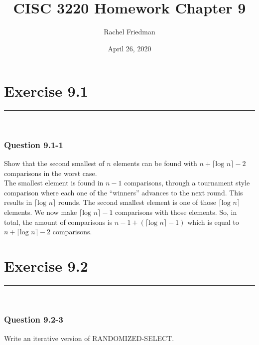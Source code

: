 \documentclass[11pt]{article}
\title{CISC 3220 Homework Chapter 9}
\author{Rachel Friedman}
\date{April 26, 2020}
\begin{document}
\maketitle

\section*{Exercise 9.1}\nointerlineskip
\noindent \rule{\linewidth}{0.01pt}\\
\subsubsection*{Question 9.1-1}\nointerlineskip

Show that the second smallest of $n$ elements can be found with $n+\lceil \text{log }n \rceil - 2 $ comparisons in the worst case.\\

The smallest element is found in $n-1$ comparisons, through a tournament style comparison where each one of the ``winners'' advances to the next round. This results in $\lceil \text{log }n \rceil$ rounds. The second smallest element is one of those $\lceil \text{log }n \rceil$ elements. We now make $\lceil \text{log }n \rceil -1$ comparisons with those elements. So, in total, the amount of comparisons is $n-1 + (\lceil \text{log }n \rceil - 1)$ which is equal to $n+\lceil \text{log } n \rceil - 2 $ comparisons.\\

\section*{Exercise 9.2}\nointerlineskip
\noindent \rule{\linewidth}{0.01pt}\\
\subsubsection*{Question 9.2-3}\nointerlineskip
Write an iterative version of RANDOMIZED-SELECT.\\
\end{document}
